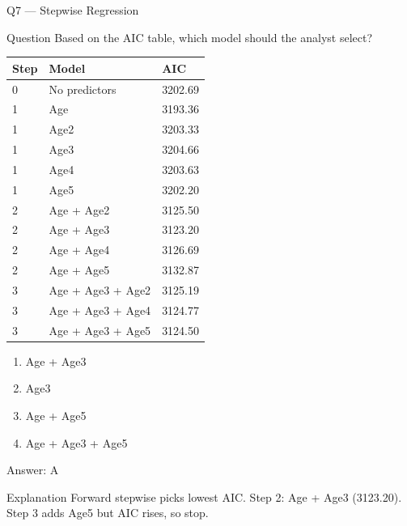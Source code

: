 \documentclass[aspectratio=169,8pt]{beamer}
\begin{document}
	\begin{frame}{Q7 --- Stepwise Regression}
		\begin{block}{Question}
			Based on the AIC table, which model should the analyst select?
		\end{block}
		\begin{center}
			\small
			\begin{tabular}{@{}lll@{}}
				\toprule
				Step & Model & AIC \\
				\midrule
				0 & No predictors & 3202.69 \\
				1 & Age & 3193.36 \\
				1 & Age2 & 3203.33 \\
				1 & Age3 & 3204.66 \\
				1 & Age4 & 3203.63 \\
				1 & Age5 & 3202.20 \\
				2 & Age + Age2 & 3125.50 \\
				2 & Age + Age3 & 3123.20 \\
				2 & Age + Age4 & 3126.69 \\
				2 & Age + Age5 & 3132.87 \\
				3 & Age + Age3 + Age2 & 3125.19 \\
				3 & Age + Age3 + Age4 & 3124.77 \\
				3 & Age + Age3 + Age5 & 3124.50 \\
				\bottomrule
			\end{tabular}
		\end{center}
		\begin{enumerate}[label=\Alph*.]
			\item Age + Age3
			\item Age3
			\item Age + Age5
			\item Age + Age3 + Age5
		\end{enumerate}
		\begin{exampleblock}{Answer: A}
		\end{exampleblock}
		\begin{block}{Explanation}
			Forward stepwise picks lowest AIC. Step 2: Age + Age3 (3123.20). Step 3 adds Age5 but AIC rises, so stop.
		\end{block}
	\end{frame}
	
\end{document}
